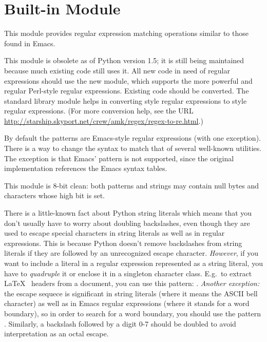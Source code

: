 \section{Built-in Module }
\label{module-regex}

This module provides regular expression matching operations similar to
those found in Emacs.

This module is obsolete as of Python version 1.5; it is still being
maintained because much existing code still uses it.  All new code in
need of regular expressions should use the new
 module, which supports the more powerful
and regular Perl-style regular expressions.  Existing code should be
converted.  The standard library module
 helps in converting
 style regular expressions to 
style regular expressions.  (For more conversion help, see the URL
\url{http://starship.skyport.net/crew/amk/regex/regex-to-re.html}.)

By default the patterns are Emacs-style regular expressions
(with one exception).  There is
a way to change the syntax to match that of several well-known
\UNIX{} utilities.  The exception is that Emacs' 
pattern is not supported, since the original implementation references
the Emacs syntax tables.

This module is 8-bit clean: both patterns and strings may contain null
bytes and characters whose high bit is set.

 There is a little-known fact about Python string
literals which means that you don't usually have to worry about
doubling backslashes, even though they are used to escape special
characters in string literals as well as in regular expressions.  This
is because Python doesn't remove backslashes from string literals if
they are followed by an unrecognized escape character.
\emph{However}, if you want to include a literal  in a
regular expression represented as a string literal, you have to
\emph{quadruple} it or enclose it in a singleton character class.
E.g.\  to extract \LaTeX\  headers from a document, you can use this pattern:
.  \emph{Another exception:}
the escape sequece  is significant in string literals
(where it means the ASCII bell character) as well as in Emacs regular
expressions (where it stands for a word boundary), so in order to
search for a word boundary, you should use the pattern .
Similarly, a backslash followed by a digit 0-7 should be doubled to
avoid interpretation as an octal escape.

